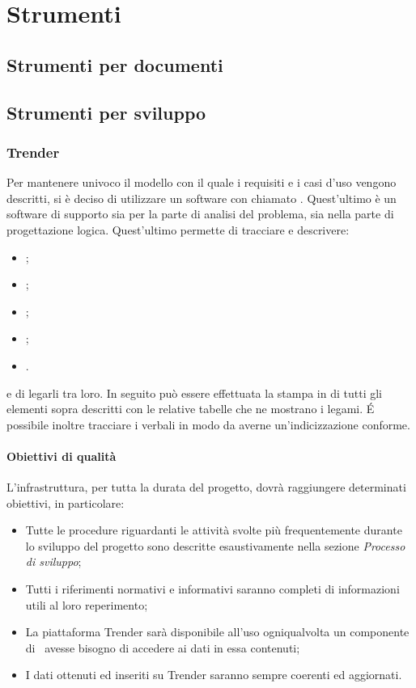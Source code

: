 \documentclass[../NormeDiProgetto.tex]{subfiles}
\begin{document}
\section{Strumenti}
	\subsection{Strumenti per documenti}


	\subsection{Strumenti per sviluppo}
			\subsubsection{Trender}
            Per mantenere univoco il modello con il quale i requisiti e i casi d'uso vengono descritti, si è deciso di utilizzare un software con  chiamato .
            Quest'ultimo è un software di supporto sia per la parte di analisi del problema, sia nella parte di progettazione logica.
            Quest'ultimo permette di tracciare e descrivere:
            \begin{itemize}
                  \item {};
                  \item {};
                  \item {};
                  \item {};
                  \item {}.
            \end{itemize}
            e di legarli tra loro. In seguito può essere effettuata la stampa in \gl{\LaTeX} di tutti gli elementi sopra descritti con le relative tabelle che ne mostrano i legami. É possibile inoltre tracciare i verbali in modo da averne un'indicizzazione conforme.
		
			\paragraph{Obiettivi di qualità}
			L'infrastruttura, per tutta la durata del progetto, dovrà raggiungere determinati obiettivi, in particolare:
			\begin{itemize}
				\item Tutte le procedure riguardanti le attività svolte più frequentemente durante lo sviluppo del progetto sono descritte esaustivamente nella sezione \textit{Processo di sviluppo};
				\item Tutti i riferimenti normativi e informativi saranno completi di informazioni utili al loro reperimento;
				\item La piattaforma Trender sarà disponibile all'uso ogniqualvolta un componente di \kpanic\ avesse bisogno di accedere ai dati in essa contenuti;
				\item I dati ottenuti ed inseriti su Trender saranno sempre coerenti ed aggiornati.
			\end{itemize}
			
\end{document}
